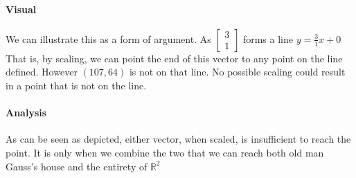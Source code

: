 \documentclass{article}
\begin{document}
    \paragraph{Visual}
        We can illustrate this as a form of argument. As $\begin{bmatrix}3 \\ 1\end{bmatrix}$ forms a line
        $y=\frac{3}{1}x+0$ That is, by scaling, we can point the end of this vector
        to any point on the line defined. However $(107, 64)$ is not on that line. No possible scaling
        could result in a point that is not on the line.
        \begin{center}
        \end{center}
    \paragraph{Analysis}
    As can be seen as depicted, either vector, when scaled, is insufficient
    to reach the point. It is only when we combine the two that we can reach
    both old man Gauss's house and the entirety of $\mathbb{R}^2$
\end{document}
